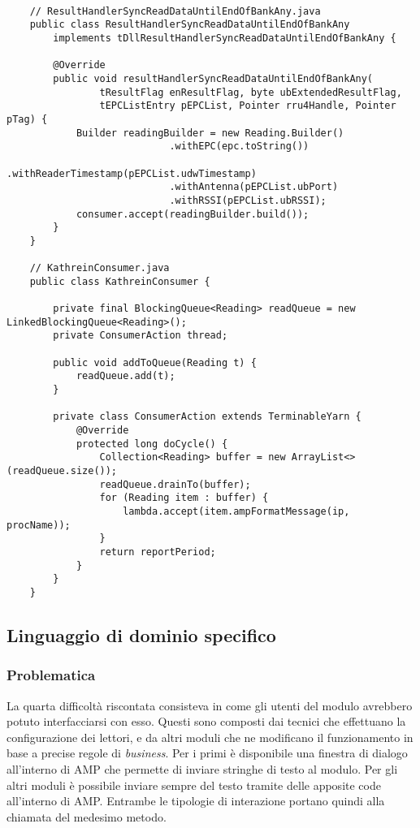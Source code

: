 \label{HandlerReading}
\begin{lstlisting}
    
    // ResultHandlerSyncReadDataUntilEndOfBankAny.java
    public class ResultHandlerSyncReadDataUntilEndOfBankAny
        implements tDllResultHandlerSyncReadDataUntilEndOfBankAny {

        @Override
        public void resultHandlerSyncReadDataUntilEndOfBankAny(
                tResultFlag enResultFlag, byte ubExtendedResultFlag,
                tEPCListEntry pEPCList, Pointer rru4Handle, Pointer pTag) {
            Builder readingBuilder = new Reading.Builder()
				    	    .withEPC(epc.toString())
					        .withReaderTimestamp(pEPCList.udwTimestamp)
					        .withAntenna(pEPCList.ubPort)
					        .withRSSI(pEPCList.ubRSSI);
            consumer.accept(readingBuilder.build());
        }
    }
    
    // KathreinConsumer.java
    public class KathreinConsumer {

        private final BlockingQueue<Reading> readQueue = new LinkedBlockingQueue<Reading>();
        private ConsumerAction thread;
        
        public void addToQueue(Reading t) {
		    readQueue.add(t);
	    }

        private class ConsumerAction extends TerminableYarn {
		    @Override
		    protected long doCycle() {
			    Collection<Reading> buffer = new ArrayList<>(readQueue.size());
			    readQueue.drainTo(buffer);
			    for (Reading item : buffer) {
				    lambda.accept(item.ampFormatMessage(ip, procName));
			    }
			    return reportPeriod;
		    }
	    }
    }
\end{lstlisting}

\subsection{Linguaggio di dominio specifico}
\label{sub-sec:DLS}
\subsubsection*{Problematica}
La quarta difficoltà riscontata consisteva in come gli utenti del modulo avrebbero potuto interfacciarsi con esso.
Questi sono composti dai tecnici che effettuano la configurazione dei lettori, e da altri moduli che ne modificano il funzionamento
in base a precise regole di \emph{business}. Per i primi è disponibile una finestra di dialogo all'interno di AMP che permette
di inviare stringhe di testo al modulo. Per gli altri moduli è possibile inviare sempre del testo
tramite delle apposite code all'interno di AMP. Entrambe le tipologie di interazione portano quindi alla chiamata del medesimo metodo.

